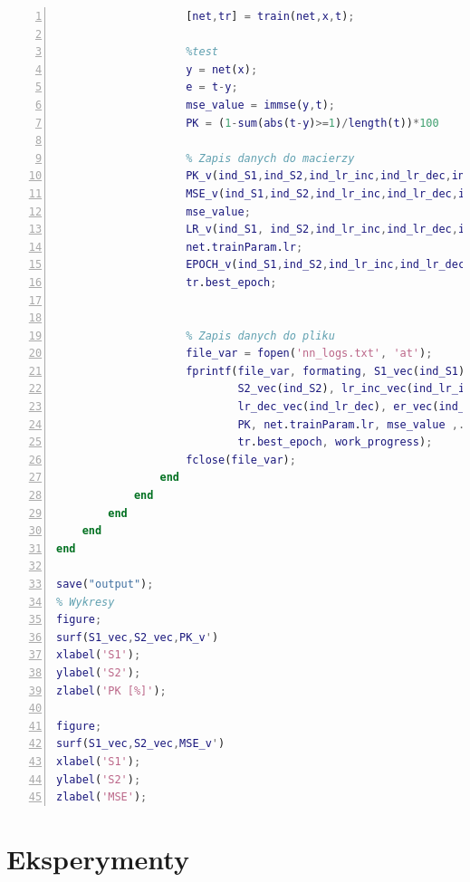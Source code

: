 \documentclass[a4paper, openright, twoside,11pt]{article}
\begin{document}
\begin{lstlisting}[language=Matlab, caption=Skrypt sieci neuronowej, label=skrypt,numbers=left]
                    %trenowanie sieci
                    [net,tr] = train(net,x,t);
                    
                    %test
                    y = net(x);
                    e = t-y;
                    mse_value = immse(y,t);                    
                    PK = (1-sum(abs(t-y)>=1)/length(t))*100
                    
                    % Zapis danych do macierzy
                    PK_v(ind_S1,ind_S2,ind_lr_inc,ind_lr_dec,ind_er) = PK;
                    MSE_v(ind_S1,ind_S2,ind_lr_inc,ind_lr_dec,ind_er) = ...
                    mse_value;
                    LR_v(ind_S1, ind_S2,ind_lr_inc,ind_lr_dec,ind_er) = ...
                    net.trainParam.lr;
                    EPOCH_v(ind_S1,ind_S2,ind_lr_inc,ind_lr_dec,ind_er) = ...
                    tr.best_epoch;
                    
                     
                    % Zapis danych do pliku
                    file_var = fopen('nn_logs.txt', 'at');
                    fprintf(file_var, formating, S1_vec(ind_S1),...
                            S2_vec(ind_S2), lr_inc_vec(ind_lr_inc),...
                            lr_dec_vec(ind_lr_dec), er_vec(ind_er),...
                            PK, net.trainParam.lr, mse_value ,...
                            tr.best_epoch, work_progress);
                    fclose(file_var);
                end
            end
        end
    end
end

save("output");
% Wykresy
figure;
surf(S1_vec,S2_vec,PK_v')
xlabel('S1');
ylabel('S2');
zlabel('PK [%]');

figure;
surf(S1_vec,S2_vec,MSE_v')
xlabel('S1');
ylabel('S2');
zlabel('MSE');
\end{lstlisting}
    
    \clearpage
    \section{Eksperymenty}
    
    
    
    
    
    
    
    \clearpage
\end{document}
